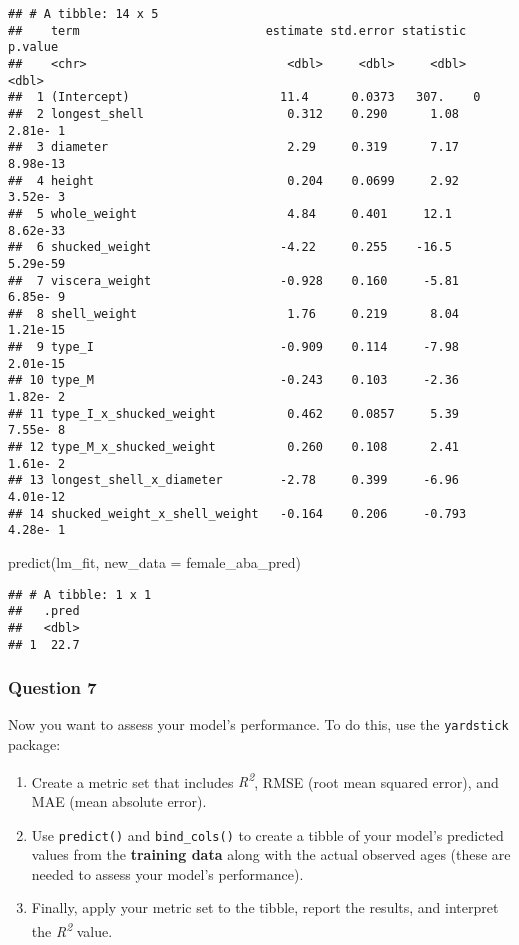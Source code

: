 \documentclass[
]{article}
\newenvironment{Shaded}{\begin{snugshade}}{\end{snugshade}}
\newcommand{\AttributeTok}[1]{\textcolor[rgb]{0.77,0.63,0.00}{#1}}
\newcommand{\FunctionTok}[1]{\textcolor[rgb]{0.00,0.00,0.00}{#1}}
\newcommand{\NormalTok}[1]{#1}
\providecommand{\tightlist}{%
  \setlength{\itemsep}{0pt}\setlength{\parskip}{0pt}}
\begin{document}
\begin{verbatim}
## # A tibble: 14 x 5
##    term                          estimate std.error statistic  p.value
##    <chr>                            <dbl>     <dbl>     <dbl>    <dbl>
##  1 (Intercept)                     11.4      0.0373   307.    0       
##  2 longest_shell                    0.312    0.290      1.08  2.81e- 1
##  3 diameter                         2.29     0.319      7.17  8.98e-13
##  4 height                           0.204    0.0699     2.92  3.52e- 3
##  5 whole_weight                     4.84     0.401     12.1   8.62e-33
##  6 shucked_weight                  -4.22     0.255    -16.5   5.29e-59
##  7 viscera_weight                  -0.928    0.160     -5.81  6.85e- 9
##  8 shell_weight                     1.76     0.219      8.04  1.21e-15
##  9 type_I                          -0.909    0.114     -7.98  2.01e-15
## 10 type_M                          -0.243    0.103     -2.36  1.82e- 2
## 11 type_I_x_shucked_weight          0.462    0.0857     5.39  7.55e- 8
## 12 type_M_x_shucked_weight          0.260    0.108      2.41  1.61e- 2
## 13 longest_shell_x_diameter        -2.78     0.399     -6.96  4.01e-12
## 14 shucked_weight_x_shell_weight   -0.164    0.206     -0.793 4.28e- 1
\end{verbatim}

\begin{Shaded}
\begin{Highlighting}[]
\FunctionTok{predict}\NormalTok{(lm\_fit, }\AttributeTok{new\_data =}\NormalTok{ female\_aba\_pred)}
\end{Highlighting}
\end{Shaded}

\begin{verbatim}
## # A tibble: 1 x 1
##   .pred
##   <dbl>
## 1  22.7
\end{verbatim}

\hypertarget{question-7}{%
\subsubsection{Question 7}\label{question-7}}

Now you want to assess your model's performance. To do this, use the
\texttt{yardstick} package:

\begin{enumerate}
\def\labelenumi{\arabic{enumi}.}
\tightlist
\item
  Create a metric set that includes \emph{R\textsuperscript{2}}, RMSE
  (root mean squared error), and MAE (mean absolute error).
\item
  Use \texttt{predict()} and \texttt{bind\_cols()} to create a tibble of
  your model's predicted values from the \textbf{training data} along
  with the actual observed ages (these are needed to assess your model's
  performance).
\item
  Finally, apply your metric set to the tibble, report the results, and
  interpret the \emph{R\textsuperscript{2}} value.
\end{enumerate}
\end{document}
